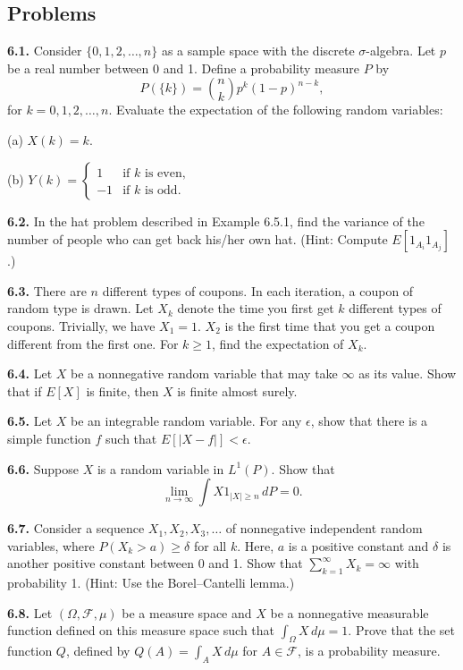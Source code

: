 \subsection*{Problems}

\textbf{6.1.} Consider $\{0,1,2,\dots,n\}$ as a sample space with the discrete $\sigma$-algebra. Let $p$ be a real number between 0 and 1. Define a probability measure $P$ by
\[
P(\{k\}) = \binom{n}{k}p^k(1-p)^{n-k},
\]
for $k=0,1,2,\dots,n$. Evaluate the expectation of the following random variables:

\noindent (a) \quad $X(k)=k$.

\noindent (b) \quad $Y(k)=
\begin{cases}
1 & \text{if } k \text{ is even}, \\
-1 & \text{if } k \text{ is odd}.
\end{cases}$

\textbf{6.2.} In the hat problem described in Example 6.5.1, find the variance of the number of people who can get back his/her own hat. (Hint: Compute $E[1_{A_i}1_{A_j}]$.)

\textbf{6.3.} There are $n$ different types of coupons. In each iteration, a coupon of random type is drawn. Let $X_k$ denote the time you first get $k$ different types of coupons. Trivially, we have $X_1=1$. $X_2$ is the first time that you get a coupon different from the first one. For $k \ge 1$, find the expectation of $X_k$.

\textbf{6.4.} Let $X$ be a nonnegative random variable that may take $\infty$ as its value. Show that if $E[X]$ is finite, then $X$ is finite almost surely.

\textbf{6.5.} Let $X$ be an integrable random variable. For any $\epsilon$, show that there is a simple function $f$ such that $E[|X-f|]<\epsilon$.

\textbf{6.6.} Suppose $X$ is a random variable in $L^1(P)$. Show that
\[
\lim_{n\to\infty} \int X1_{|X|\ge n}\, dP = 0.
\]

\textbf{6.7.} Consider a sequence $X_1,X_2,X_3,\dots$ of nonnegative independent random variables, where $P(X_k>a)\ge \delta$ for all $k$. Here, $a$ is a positive constant and $\delta$ is another positive constant between 0 and 1. Show that $\sum_{k=1}^{\infty} X_k=\infty$ with probability 1. (Hint: Use the Borel--Cantelli lemma.)

\textbf{6.8.} Let $(\Omega,\mathcal{F},\mu)$ be a measure space and $X$ be a nonnegative measurable function defined on this measure space such that $\int_{\Omega} X\, d\mu =1$. Prove that the set function $Q$, defined by $Q(A)=\int_A X\, d\mu$ for $A\in\mathcal{F}$, is a probability measure.

